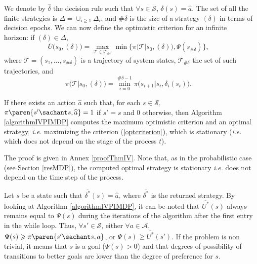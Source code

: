 We denote by $\widehat{\delta}$ the decision rule 
such that $\forall s \in \mathcal{S}$, $\widehat{\delta}(s)=\widehat{a}$. 
The set of all the finite strategies is 
$\Delta =\cup_{i \geqslant 1} \Delta_i$, 
and $\# \delta$ is the size of a strategy $(\delta)$ 
in terms of decision epochs. 
We can now define the optimistic criterion 
for an infinite horizon: 
if $(\delta) \in \Delta$,
\begin{equation} 
\label{optcriterion} 
\overline{U} \Big( s_0,(\delta) \Big) 
= \max_{ \mathcal{T} \in \mathcal{T}_{\# \delta}} 
\min \bigg\{ \pi \Big( \mathcal{T} \Big\vert s_0, (\delta) \Big), \Psi(s_{\# \delta}) \bigg\},
\end{equation}
where $\mathcal{T} = (s_1,\ldots,s_{\# \delta})$ is a trajectory of system states,
$\mathcal{T}_{\# \delta}$ the set of such trajectories,
and 
\[ \pi \Big( \mathcal{T} \Big\vert s_0, (\delta) \Big) 
= \min_{i=0}^{\# \delta - 1} \pi \Big( s_{i+1} \Big\vert s_i, \delta_i(s_i)  \Big). \]
\begin{theorem}
\label{thmIV} If there exists an action $\widehat{a}$ such that, 
for each $s \in \mathcal{S}$, $\pi \paren{s' \sachant s, \widehat{a} } = 1$ 
if $s'=s$ and $0$ otherwise, 
then Algorithm \ref{algorithmIVPIMDP} 
computes the maximum optimistic criterion 
and an optimal strategy,
\textit{i.e.} maximizing the criterion (\ref{optcriterion}),
which is stationary 
(\textit{i.e.} which does not depend on the stage of the process $t$).
\end{theorem}
The proof is given in Annex \ref{proofThmIV}. Note that, as in the probabilistic case
(see Section \ref{resMDP}), the computed optimal strategy is stationary
\textit{i.e.} does not depend on the time step of the process.

Let $s$ be a state such that $\overline{\delta^*}(s)=\widehat{a}$, 
where $\overline{\delta^*}$ is the returned strategy. 
By looking at Algorithm \ref{algorithmIVPIMDP}, 
it can be noted that $\overline{U^*}(s)$ 
always remains equal to $\Psi(s)$ 
during the iterations of the algorithm
after the first entry in the while loop.
Thus, $\forall s' \in \mathcal{S}$, 
either $\forall a \in \mathcal{A}$, 
$\Psi(s) \geqslant \pi \paren{s' \sachant s,a}$, 
or $\Psi(s) \geqslant \overline{U^*}(s')$. 
If the problem is non trivial, 
it means that $s$ is a goal ($\Psi(s)>0$) 
and that degrees of possibility of transitions to better goals 
are lower than the degree of preference for $s$.


